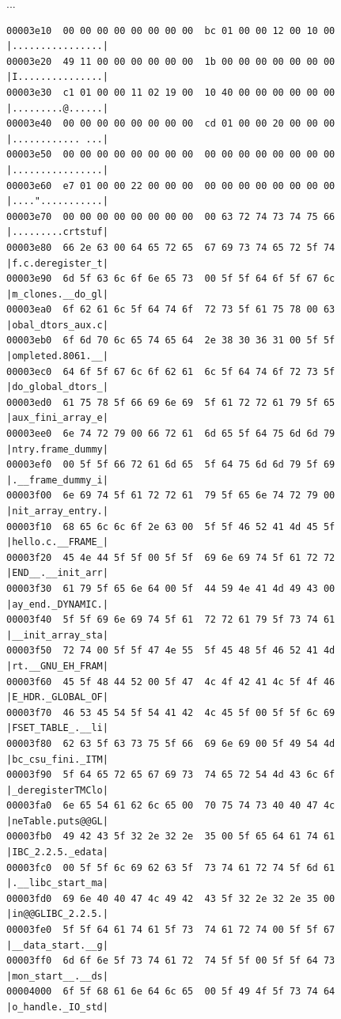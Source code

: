 \documentclass[]{project_plan}
\begin{document}
...
\begin{lstlisting}[basicstyle=\tiny]
  00003e10  00 00 00 00 00 00 00 00  bc 01 00 00 12 00 10 00  |................|
00003e20  49 11 00 00 00 00 00 00  1b 00 00 00 00 00 00 00  |I...............|
00003e30  c1 01 00 00 11 02 19 00  10 40 00 00 00 00 00 00  |.........@......|
00003e40  00 00 00 00 00 00 00 00  cd 01 00 00 20 00 00 00  |............ ...|
00003e50  00 00 00 00 00 00 00 00  00 00 00 00 00 00 00 00  |................|
00003e60  e7 01 00 00 22 00 00 00  00 00 00 00 00 00 00 00  |...."...........|
00003e70  00 00 00 00 00 00 00 00  00 63 72 74 73 74 75 66  |.........crtstuf|
00003e80  66 2e 63 00 64 65 72 65  67 69 73 74 65 72 5f 74  |f.c.deregister_t|
00003e90  6d 5f 63 6c 6f 6e 65 73  00 5f 5f 64 6f 5f 67 6c  |m_clones.__do_gl|
00003ea0  6f 62 61 6c 5f 64 74 6f  72 73 5f 61 75 78 00 63  |obal_dtors_aux.c|
00003eb0  6f 6d 70 6c 65 74 65 64  2e 38 30 36 31 00 5f 5f  |ompleted.8061.__|
00003ec0  64 6f 5f 67 6c 6f 62 61  6c 5f 64 74 6f 72 73 5f  |do_global_dtors_|
00003ed0  61 75 78 5f 66 69 6e 69  5f 61 72 72 61 79 5f 65  |aux_fini_array_e|
00003ee0  6e 74 72 79 00 66 72 61  6d 65 5f 64 75 6d 6d 79  |ntry.frame_dummy|
00003ef0  00 5f 5f 66 72 61 6d 65  5f 64 75 6d 6d 79 5f 69  |.__frame_dummy_i|
00003f00  6e 69 74 5f 61 72 72 61  79 5f 65 6e 74 72 79 00  |nit_array_entry.|
00003f10  68 65 6c 6c 6f 2e 63 00  5f 5f 46 52 41 4d 45 5f  |hello.c.__FRAME_|
00003f20  45 4e 44 5f 5f 00 5f 5f  69 6e 69 74 5f 61 72 72  |END__.__init_arr|
00003f30  61 79 5f 65 6e 64 00 5f  44 59 4e 41 4d 49 43 00  |ay_end._DYNAMIC.|
00003f40  5f 5f 69 6e 69 74 5f 61  72 72 61 79 5f 73 74 61  |__init_array_sta|
00003f50  72 74 00 5f 5f 47 4e 55  5f 45 48 5f 46 52 41 4d  |rt.__GNU_EH_FRAM|
00003f60  45 5f 48 44 52 00 5f 47  4c 4f 42 41 4c 5f 4f 46  |E_HDR._GLOBAL_OF|
00003f70  46 53 45 54 5f 54 41 42  4c 45 5f 00 5f 5f 6c 69  |FSET_TABLE_.__li|
00003f80  62 63 5f 63 73 75 5f 66  69 6e 69 00 5f 49 54 4d  |bc_csu_fini._ITM|
00003f90  5f 64 65 72 65 67 69 73  74 65 72 54 4d 43 6c 6f  |_deregisterTMClo|
00003fa0  6e 65 54 61 62 6c 65 00  70 75 74 73 40 40 47 4c  |neTable.puts@@GL|
00003fb0  49 42 43 5f 32 2e 32 2e  35 00 5f 65 64 61 74 61  |IBC_2.2.5._edata|
00003fc0  00 5f 5f 6c 69 62 63 5f  73 74 61 72 74 5f 6d 61  |.__libc_start_ma|
00003fd0  69 6e 40 40 47 4c 49 42  43 5f 32 2e 32 2e 35 00  |in@@GLIBC_2.2.5.|
00003fe0  5f 5f 64 61 74 61 5f 73  74 61 72 74 00 5f 5f 67  |__data_start.__g|
00003ff0  6d 6f 6e 5f 73 74 61 72  74 5f 5f 00 5f 5f 64 73  |mon_start__.__ds|
00004000  6f 5f 68 61 6e 64 6c 65  00 5f 49 4f 5f 73 74 64  |o_handle._IO_std|

\end{lstlisting}
\end{document}
